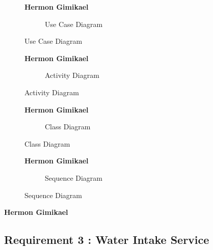 \documentclass{article}
\begin{document}
\clearpage

\begin{figure}[htbp]
	\textbf{Hermon Gimikael}
	\centering
	\begin{subfigure}{\textwidth}
		\resizebox{\textwidth}{!}{}
		\caption{Use Case Diagram}
	\end{subfigure}
\end{figure}

\clearpage


\begin{figure}[htbp]
	\textbf{Hermon Gimikael}
	\centering
	\begin{subfigure}{\textwidth}
		\resizebox{\textwidth}{!}{}
		\caption{Activity Diagram}
	\end{subfigure}
\end{figure}

\clearpage

\begin{figure}[htbp]
	\textbf{Hermon Gimikael}
	\centering
	\begin{subfigure}{\textwidth}
		\resizebox{\textwidth}{!}{}
		\caption{Class Diagram}
	\end{subfigure}
\end{figure}

\clearpage

\begin{figure}[htbp]
	\textbf{Hermon Gimikael}
	\centering
	\begin{subfigure}{\textwidth}
		\resizebox{\textwidth}{!}{}
		\caption{Sequence Diagram}
	\end{subfigure}
\end{figure}

\clearpage

\textbf{Hermon Gimikael}
\subsection{Requirement 3 : Water Intake Service}
\end{document}
